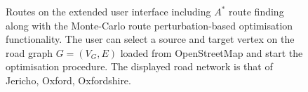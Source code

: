 \documentclass{prettytex/ox/mmsc-special-topic}
\begin{document}
  \begin{figure}[H]
    \captionsetup[subfigure]{justification=centering}
    \centering
    \hfill
    \par
    \vspace{0.5cm}
    \hfill
    \par
    \caption{Routes on the extended user interface including $A^*$ route finding along with the Monte-Carlo route perturbation-based optimisation functionality. The user can select a source and target vertex on the road graph $G = (V_G, E)$ loaded from OpenStreetMap and start the optimisation procedure. The displayed road network is that of Jericho, Oxford, Oxfordshire.}
    \label{fig:perturbations}
  \end{figure}
\end{document}
